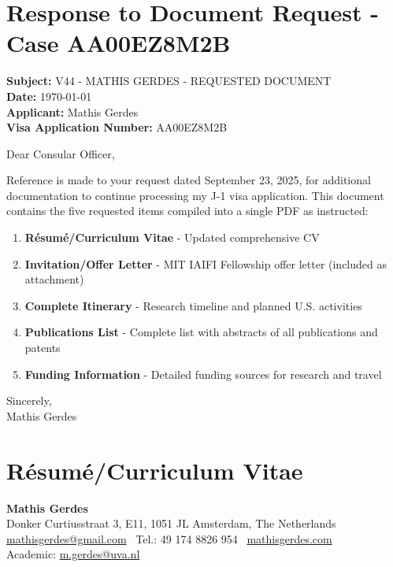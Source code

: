 \documentclass[11pt]{article}
\title{}
\author{}
\date{}
\newcommand{\currentsection}{}
\newcommand{\sectionwithheader}[1]{
    \section{#1}
    \renewcommand{\currentsection}{\thesection. #1}
}
\begin{document}
\section*{Response to Document Request - Case AA00EZ8M2B}

\textbf{Subject:} V44 - MATHIS GERDES - REQUESTED DOCUMENT\\
\textbf{Date:} \today\\
\textbf{Applicant:} Mathis Gerdes\\
\textbf{Visa Application Number:} AA00EZ8M2B

Dear Consular Officer,

Reference is made to your request dated September 23, 2025, for additional documentation to continue processing my J-1 visa application. This document contains the five requested items compiled into a single PDF as instructed:

\begin{enumerate}
\item \textbf{Résumé/Curriculum Vitae} - Updated comprehensive CV
\item \textbf{Invitation/Offer Letter} - MIT IAIFI Fellowship offer letter (included as attachment)
\item \textbf{Complete Itinerary} - Research timeline and planned U.S. activities
\item \textbf{Publications List} - Complete list with abstracts of all publications and patents
\item \textbf{Funding Information} - Detailed funding sources for research and travel
\end{enumerate}

\vspace{0.2cm}

Sincerely,\\
Mathis Gerdes

\newpage

\sectionwithheader{Résumé/Curriculum Vitae}

\vspace{0.4cm}
\begin{center}
    {\Huge \textbf{Mathis Gerdes}} \\
    \vspace{0.15cm}
    Donker Curtiusstraat 3, E11, 1051 JL Amsterdam, The Netherlands \\
    \href{mailto:mathisgerdes@gmail.com}{mathisgerdes@gmail.com} \textbullet\
    Tel.: \raisebox{0.2\height}{\footnotesize +}49 174 8826 954 \textbullet\
    \href{http://www.mathisgerdes.com}{mathisgerdes.com} \\
    Academic: \href{mailto:m.gerdes@uva.nl}{m.gerdes@uva.nl}
\end{center}
\end{document}
